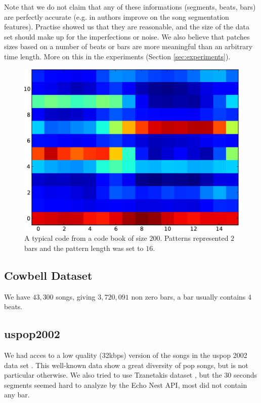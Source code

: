 \documentclass{article}
\begin{document}
Note that we do not claim that any of these informations (segments, beats, bars)
are perfectly accurate (e.g. in \cite{Barrington2009a} authors improve on the
song segmentation features). Practise showed us that they are reasonable, 
and the size of the data set should make up for the imperfections or noise.
We also believe that patches sizes based on a number of beats or bars are more
meaningful than an arbitrary time length. More on this in the experiments
(Section \ref{sec:experiments}).


\begin{figure}[htb]
\begin{center}
\includegraphics[width=.8\columnwidth]{code}
\end{center}
\caption{{A typical code from a code book of size $200$. Patterns represented
$2$ bars and the pattern length was set to $16$.}}
\label{fig:code}
\end{figure}

\subsection{Cowbell Dataset}
We have $43,300$ songs, giving  $3,720,091$ non zero bars, a bar usually 
contains $4$ beats.


\subsection{uspop2002}
We had acces to a low quality (32kbps) version of the songs in the uspop 2002 
data set \cite{uspop2002}.
This well-known data show a great diversity of pop songs, but is not particular
otherwise. We also tried to use Tzanetakis dataset \cite{Tzanetakis2002a}, but 
the $30$ seconds segments seemed hard to analyze by the Echo Nest API, most did
not contain any bar.
\end{document}

